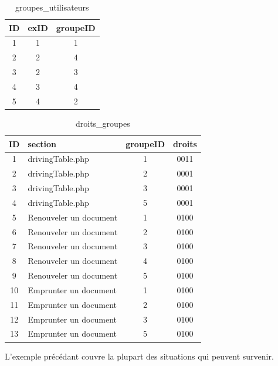 \documentclass[letter, 11pt]{report}
\begin{document}
\begin{table}[h!]
	\caption{groupes\_utilisateurs}
	\begin{center}
		\begin{tabular}{|c|c|c|}
			\hline
			ID & exID & groupeID \\
			\hline
			1  & 1    & 1 \\
			2  & 2    & 4 \\
			3  & 2    & 3 \\
			4  & 3    & 4 \\
			5  & 4    & 2 \\
			\hline
		\end{tabular}
	\end{center}
\end{table}

\begin{table}[h!]
	\caption{droits\_groupes}
	\begin{center}
		\begin{tabular}{|c|l|c|c|}
			\hline
			ID & section                & groupeID & droits \\
			\hline
			1  & drivingTable.php       & 1        & 0011 \\
			2  & drivingTable.php       & 2        & 0001 \\
			3  & drivingTable.php       & 3        & 0001 \\
			4  & drivingTable.php       & 5        & 0001 \\
			5  & Renouveler un document & 1        & 0100 \\
			6  & Renouveler un document & 2        & 0100 \\
			7  & Renouveler un document & 3        & 0100 \\
			8  & Renouveler un document & 4        & 0100 \\
			9  & Renouveler un document & 5        & 0100 \\
			10 & Emprunter un document  & 1        & 0100 \\
			11 & Emprunter un document  & 2        & 0100 \\
			12 & Emprunter un document  & 3        & 0100 \\
			13 & Emprunter un document  & 5        & 0100 \\
			\hline
		\end{tabular}
	\end{center}
\end{table}

L'exemple précédant couvre la plupart des situations qui peuvent survenir.
\end{document}
